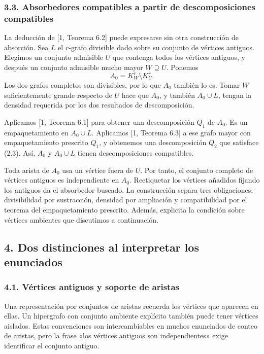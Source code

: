 \documentclass[spanish,11pt,a4paper]{article}
\begin{document}
\subsubsection{3.3. Absorbedores compatibles a partir de descomposiciones compatibles}\label{absorbedores-compatibles-a-partir-de-descomposiciones-compatibles}

La deducción de {[}1, Teorema 6.2{]} puede expresarse sin otra construcción de absorción. Sea \(L\) el \(r\)-grafo divisible dado sobre su conjunto de vértices antiguos. Elegimos un conjunto admisible \(U\) que contenga todos los vértices antiguos, y después un conjunto admisible mucho mayor \(W\supseteq U\). Ponemos \[A_0=K_W^r\setminus K_U^r.
\tag{3.5}\] Los dos grafos completos son divisibles, por lo que \(A_0\) también lo es. Tomar \(W\) suficientemente grande respecto de \(U\) hace que \(A_0\), y también \(A_0\cup L\), tengan la densidad requerida por los dos resultados de descomposición.

Aplicamos {[}1, Teorema 6.1{]} para obtener una descomposición \(Q_1\) de \(A_0\). Es un empaquetamiento en \(A_0\cup L\). Aplicamos {[}1, Teorema 6.3{]} a ese grafo mayor con empaquetamiento prescrito \(Q_1\), y obtenemos una descomposición \(Q_2\) que satisface (2.3). Así, \(A_0\) y \(A_0\cup L\) tienen descomposiciones compatibles.

Toda arista de \(A_0\) usa un vértice fuera de \(U\). Por tanto, el conjunto completo de vértices antiguos es independiente en \(A_0\). Reetiquetar los vértices añadidos fijando los antiguos da el absorbedor buscado. La construcción separa tres obligaciones: divisibilidad por sustracción, densidad por ampliación y compatibilidad por el teorema del empaquetamiento prescrito. Además, explicita la condición sobre vértices ambientes que discutimos a continuación.

\subsection{4. Dos distinciones al interpretar los enunciados}\label{dos-distinciones-al-interpretar-los-enunciados}


\subsubsection{4.1. Vértices antiguos y soporte de aristas}\label{vuxe9rtices-antiguos-y-soporte-de-aristas}

Una representación por conjuntos de aristas recuerda los vértices que aparecen en ellas. Un hipergrafo con conjunto ambiente explícito también puede tener vértices aislados. Estas convenciones son intercambiables en muchos enunciados de conteo de aristas, pero la frase «los vértices antiguos son independientes» exige identificar el conjunto antiguo.
\end{document}
